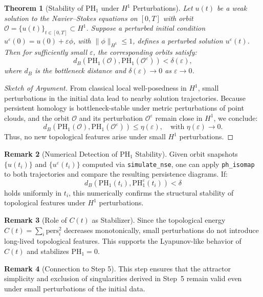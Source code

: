 \documentclass[11pt]{article}
\newtheorem{theorem}{Theorem}[section]
\theoremstyle{definition}
\newtheorem{remark}[theorem]{Remark}
\begin{document}
\begin{theorem}[Stability of PH$_1$ under $H^1$ Perturbations]
Let $u(t)$ be a weak solution to the Navier--Stokes equations on $[0,T]$ with orbit $\mathcal{O} = \{ u(t) \}_{t \in [0,T]} \subset H^1$. Suppose a perturbed initial condition $u^\varepsilon(0) = u(0) + \varepsilon \phi$, with $\|\phi\|_{H^1} \le 1$, defines a perturbed solution $u^\varepsilon(t)$. Then for sufficiently small $\varepsilon$, the corresponding orbits satisfy:
\[
d_B(\mathrm{PH}_1(\mathcal{O}), \mathrm{PH}_1(\mathcal{O}^\varepsilon)) < \delta(\varepsilon),
\]
where $d_B$ is the bottleneck distance and $\delta(\varepsilon) \to 0$ as $\varepsilon \to 0$.
\end{theorem}

\begin{proof}[Sketch of Argument]
From classical local well-posedness in $H^1$, small perturbations in the initial data lead to nearby solution trajectories. Because persistent homology is bottleneck-stable under metric perturbations of point clouds, and the orbit $\mathcal{O}$ and its perturbation $\mathcal{O}^\varepsilon$ remain close in $H^1$, we conclude:
\[
d_B(\mathrm{PH}_1(\mathcal{O}), \mathrm{PH}_1(\mathcal{O}^\varepsilon)) \le \eta(\varepsilon), \quad \text{with } \eta(\varepsilon) \to 0.
\]
Thus, no new topological features arise under small $H^1$ perturbations.
\end{proof}

\begin{remark}[Numerical Detection of PH$_1$ Stability]
Given orbit snapshots $\{ u(t_i) \}$ and $\{ u^\varepsilon(t_i) \}$ computed via \texttt{simulate\_nse}, one can apply \texttt{ph\_isomap} to both trajectories and compare the resulting persistence diagrams. If:
\[
d_B(\mathrm{PH}_1(t_i), \mathrm{PH}_1^\varepsilon(t_i)) < \delta
\]
holds uniformly in $t_i$, this numerically confirms the structural stability of topological features under $H^1$ perturbations.
\end{remark}

\begin{remark}[Role of $C(t)$ as Stabilizer]
Since the topological energy $C(t) = \sum_i \mathrm{pers}_i^2$ decreases monotonically, small perturbations do not introduce long-lived topological features. This supports the Lyapunov-like behavior of $C(t)$ and stabilizes $\mathrm{PH}_1 = 0$.
\end{remark}

\begin{remark}[Connection to Step 5]
This step ensures that the attractor simplicity and exclusion of singularities derived in Step~5 remain valid even under small perturbations of the initial data.
\end{remark}
\end{document}
